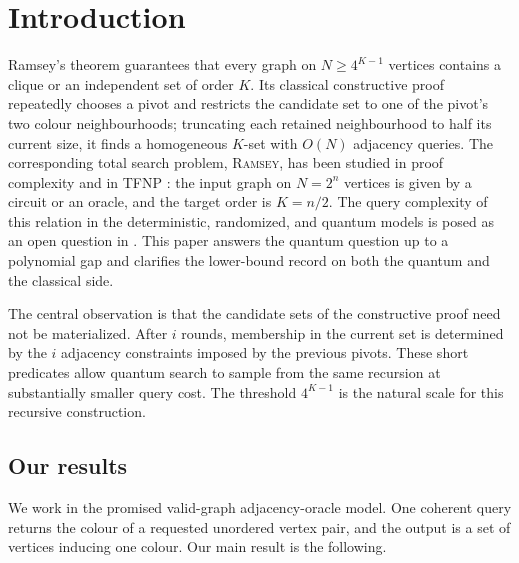 \section{Introduction}\label{sec:introduction}

Ramsey's theorem guarantees that every graph on $N\ge4^{K-1}$ vertices
contains a clique or an independent set of order $K$.  Its classical
constructive proof \cite{ErdosSzekeres1935} repeatedly chooses a pivot and
restricts the candidate set to one of the pivot's two colour
neighbourhoods; truncating each retained neighbourhood to half its current
size, it finds a homogeneous $K$-set with $O(N)$ adjacency queries.  The
corresponding total search problem, \textsc{Ramsey}, has been studied in
proof complexity and in TFNP
\cite{Krajicek2001,Krajicek2005,KomargodskiNaorYogev2019,
PasarkarPapadimitriouYannakakis2023,JainLiRobereXun2024}: the input graph on
$N=2^n$ vertices is given by a circuit or an oracle, and the target order is
$K=n/2$.  The query complexity of this relation in the deterministic,
randomized, and quantum models is posed as an open question
in \cite[Section~III]{JainLiRobereXun2024}.  This paper answers the
quantum question up to a polynomial gap and clarifies the lower-bound
record on both the quantum and the classical side.

The central observation is that the candidate sets of the constructive proof
need not be materialized.  After $i$ rounds, membership in the current set
is determined by the $i$ adjacency constraints imposed by the previous
pivots.  These short predicates allow quantum search to sample from the
same recursion at substantially smaller query cost.  The threshold $4^{K-1}$
is the natural scale for this recursive construction.

\subsection{Our results}

We work in the promised valid-graph adjacency-oracle model.  One coherent
query returns the colour of a requested unordered vertex pair, and the output
is a set of vertices inducing one colour.  Our main result is the following.

